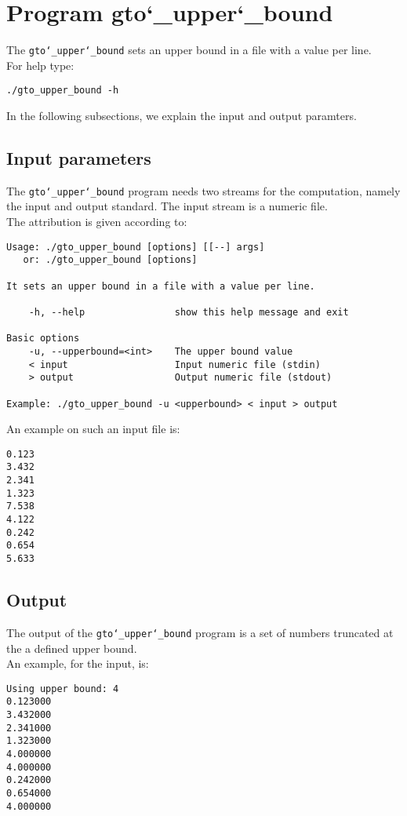 \section{Program gto\char`_upper\char`_bound}
The \texttt{gto\char`_upper\char`_bound} sets an upper bound in a file with a value per line.\\
For help type:
\begin{lstlisting}
./gto_upper_bound -h
\end{lstlisting}
In the following subsections, we explain the input and output paramters.

\subsection*{Input parameters}

The \texttt{gto\char`_upper\char`_bound} program needs two streams for the computation,
namely the input and output standard. The input stream is a numeric file.\\
The attribution is given according to:
\begin{lstlisting}
Usage: ./gto_upper_bound [options] [[--] args]
   or: ./gto_upper_bound [options]

It sets an upper bound in a file with a value per line.

    -h, --help                show this help message and exit

Basic options
    -u, --upperbound=<int>    The upper bound value
    < input                   Input numeric file (stdin)
    > output                  Output numeric file (stdout)

Example: ./gto_upper_bound -u <upperbound> < input > output
\end{lstlisting}
An example on such an input file is:
\begin{lstlisting}
0.123
3.432
2.341
1.323
7.538
4.122
0.242
0.654
5.633
\end{lstlisting}

\subsection*{Output}
The output of the \texttt{gto\char`_upper\char`_bound} program is a set of numbers truncated at the a defined upper bound.\\
An example, for the input, is:
\begin{lstlisting}
Using upper bound: 4
0.123000
3.432000
2.341000
1.323000
4.000000
4.000000
0.242000
0.654000
4.000000
\end{lstlisting}